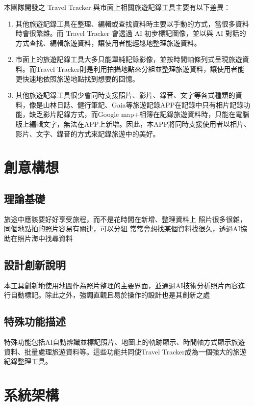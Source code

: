 \documentclass[12pt]{article}
\begin{document}
本團隊開發之 Travel Tracker 與市面上相關旅遊記錄工具主要有以下差異：

\begin{enumerate}
    \item 其他旅遊記錄工具在整理、編輯或查找資料時主要以手動的方式，當很多資料時會很繁雜。而 Travel Tracker 會透過 AI 初步標記圖像，並以與 AI 對話的方式查找、編輯旅遊資料，讓使用者能輕鬆地整理旅遊資料。
    \item 市面上的旅遊記錄工具大多只能單純記錄影像，並按時間軸條列式呈現旅遊資料。而Travel Tracker則是利用拍攝地點來分組並整理旅遊資料，讓使用者能更快速地依照旅遊地點找到想要的回憶。
    \item 其他旅遊記錄工具很少會同時支援照片、影片、錄音、文字等各式種類的資料，像是山林日誌、健行筆記、Gaia等旅遊記錄APP在記錄中只有相片記錄功能，缺乏影片記錄方式，而Google map+相簿在記錄旅遊資料時，只能在電腦版上編輯文字，無法在APP上新增。因此，本APP將同時支援使用者以相片、影片、文字、錄音的方式來記錄旅遊中的美好。
\end{enumerate}

\section{創意構想}

\subsection{理論基礎}

旅途中應該要好好享受旅程，而不是花時間在新增、整理資料上
照片很多很雜，同個地點拍的照片容易有關連，可以分組
常常會想找某個資料找很久，透過AI協助在照片海中找尋資料

\subsection{設計創新說明}

本工具創新地使用地圖作為照片整理的主要界面，並通過AI技術分析照片內容進行自動標記。除此之外，強調直觀且易於操作的設計也是其創新之處

\subsection{特殊功能描述}

特殊功能包括AI自動辨識並標記照片、地圖上的軌跡顯示、時間軸方式顯示旅遊資料、批量處理旅遊資料等。這些功能共同使Travel Tracker成為一個強大的旅遊紀錄整理工具。

\section{系統架構}
\end{document}
